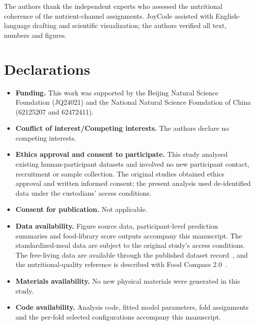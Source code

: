 \documentclass[pdflatex,sn-nature]{sn-jnl}
\theoremstyle{thmstyleone}
\theoremstyle{thmstyletwo}
\theoremstyle{thmstylethree}
\begin{document}

The authors thank the independent experts who assessed the nutritional coherence of the nutrient-channel assignments. JoyCode assisted with English-language drafting and scientific visualization; the authors verified all text, numbers and figures.

\section*{Declarations}

\begin{itemize}
\item \textbf{Funding.} This work was supported by the Beijing Natural Science Foundation (JQ24021) and the National Natural Science Foundation of China (62125207 and 62472411).
\item \textbf{Conflict of interest/Competing interests.} The authors declare no competing interests.
\item \textbf{Ethics approval and consent to participate.} This study analysed existing human-participant datasets and involved no new participant contact, recruitment or sample collection. The original studies obtained ethics approval and written informed consent; the present analysis used de-identified data under the custodians' access conditions.
\item \textbf{Consent for publication.} Not applicable.
\item \textbf{Data availability.} Figure source data, participant-level prediction summaries and food-library score outputs accompany this manuscript. The standardized-meal data are subject to the original study's access conditions. The free-living data are available through the published dataset record~\cite{cgmacros2025}, and the nutritional-quality reference is described with Food Compass 2.0~\cite{barrett}.
\item \textbf{Materials availability.} No new physical materials were generated in this study.
\item \textbf{Code availability.} Analysis code, fitted model parameters, fold assignments and the per-fold selected configurations accompany this manuscript.
\end{itemize}


\end{document}

